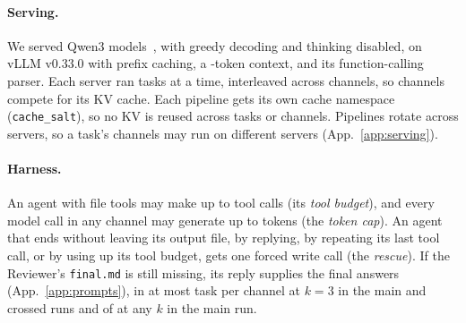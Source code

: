 \documentclass[sigplan,10pt,nonacm,review,anonymous]{acmart}
\begin{document}
\paragraph{Serving.} We served Qwen3 models~\cite{qwen3}, with greedy decoding and thinking disabled, on
vLLM v0.33.0 with prefix caching, a \nMaxLen-token context, and its function-calling parser. Each server
ran \nConcWord tasks at a time, interleaved across channels, so channels compete for its KV cache.
Each pipeline gets its own cache namespace (\texttt{cache\_salt}), so no KV is reused across tasks
or channels. Pipelines rotate across servers, so a task's channels may run on different servers (App.~\ref{app:serving}).

\paragraph{Harness.} An agent with file tools may make up to \nTurns tool calls (its \emph{tool
budget}), and every model call in any channel may generate up to \nCapMain tokens (the \emph{token cap}).
An agent that ends without leaving its output file, by replying, by repeating its last tool call, or by
using up its tool budget, gets one forced write call (the \emph{rescue}). If the Reviewer's \texttt{final.md} is still missing, its
reply supplies the final answers (App.~\ref{app:prompts}), in at most \nRTwelveFinalReplyKThreeMax task per channel at $k=3$ in the
main and crossed runs and \nRTwelveFinalReplyMax of \nRTwelveFinalReplyMaxN at any $k$ in the main run.
\end{document}
